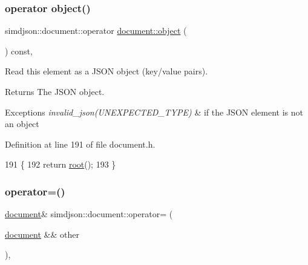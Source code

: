 \subsubsection{\texorpdfstring{operator object()}{operator object()}}
{\footnotesize\ttfamily simdjson\+::document\+::operator \hyperlink{classsimdjson_1_1document_1_1object}{document\+::object} (\begin{DoxyParamCaption}{ }\end{DoxyParamCaption}) const\hspace{0.3cm}{\ttfamily [inline]}, {\ttfamily [noexcept]}}



Read this element as a J\+S\+ON object (key/value pairs). 

\begin{DoxyReturn}{Returns}
The J\+S\+ON object. 
\end{DoxyReturn}

\begin{DoxyExceptions}{Exceptions}
{\em invalid\+\_\+json(\+U\+N\+E\+X\+P\+E\+C\+T\+E\+D\+\_\+\+T\+Y\+P\+E)} & if the J\+S\+ON element is not an object \\
\hline
\end{DoxyExceptions}


Definition at line 191 of file document.\+h.


\begin{DoxyCode}
191                                                                \{
192   \textcolor{keywordflow}{return} \hyperlink{classsimdjson_1_1document_ad240c2d93c83c378e8220e667d0bdee2}{root}();
193 \}
\end{DoxyCode}
\mbox{\label{classsimdjson_1_1document_af299e11bc22e27839e0ad25b5e7e867c}} 
\subsubsection{\texorpdfstring{operator=()}{operator=()}}
{\footnotesize\ttfamily \hyperlink{classsimdjson_1_1document}{document}\& simdjson\+::document\+::operator= (\begin{DoxyParamCaption}\item[{\hyperlink{classsimdjson_1_1document}{document} \&\&}]{other }\end{DoxyParamCaption})\hspace{0.3cm}{\ttfamily [default]}, {\ttfamily [noexcept]}}



